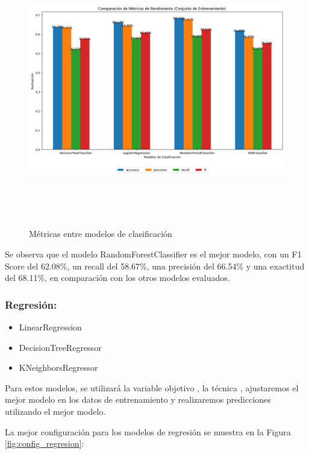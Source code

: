 \begin{figure}[H]
    \centering
    \includegraphics[width=7.06111in,height=4.68611in]{img/compara_algoritmos/metricasEntreModelosClasificacion.png}
    \caption{Métricas entre modelos de clasificación}
    \label{fig:metricas_clasificacion}
\end{figure}

Se observa que el modelo RandomForestClassifier es el mejor modelo, con un F1 Score del 62.08\%, un recall del 58.67\%, una precisión del 66.54\% y una exactitud del 68.11\%, en comparación con los otros modelos evaluados.

\subsubsection*{Regresión:}

\begin{itemize}
    \item LinearRegression
    \item DecisionTreeRegressor
    \item KNeighborsRegressor
\end{itemize}

Para estos modelos, se utilizará la variable objetivo , la técnica , ajustaremos el mejor modelo en los datos de entrenamiento y realizaremos predicciones utilizando el mejor modelo.

La mejor configuración para los modelos de regresión se muestra en la Figura \ref{fig:config_regresion}:


